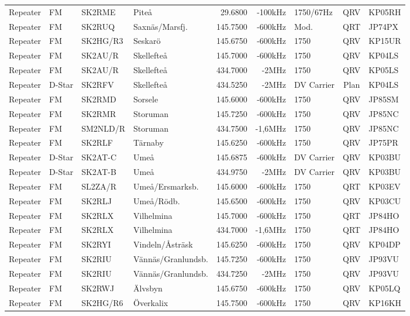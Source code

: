 \begin{landscape}
\begin{longtable}{llllrrlcl}
Repeater & FM     & SK2RME    & Piteå              & 29.6800  & -100kHz & 1750/67Hz        & QRV  & KP05RH \\
Repeater & FM     & SK2RUQ    & Saxnäs/Marsfj.     & 145.7500 & -600kHz & Mod.             & QRT  & JP74PX \\
Repeater & FM     & SK2HG/R3  & Seskarö            & 145.6750 & -600kHz & 1750             & QRV  & KP15UR \\
Repeater & FM     & SK2AU/R   & Skellefteå         & 145.7000 & -600kHz & 1750             & QRV  & KP04LS \\
Repeater & FM     & SK2AU/R   & Skellefteå         & 434.7000 & -2MHz   & 1750             & QRV  & KP05LS \\
Repeater & D-Star & SK2RFV    & Skellefteå         & 434.5250 & -2MHz   & DV Carrier       & Plan & KP04LS \\
Repeater & FM     & SK2RMD    & Sorsele            & 145.6000 & -600kHz & 1750             & QRV  & JP85SM \\
Repeater & FM     & SK2RMR    & Storuman           & 145.7250 & -600kHz & 1750             & QRV  & JP85NC \\
Repeater & FM     & SM2NLD/R  & Storuman           & 434.7500 & -1,6MHz & 1750             & QRV  & JP85NC \\
Repeater & FM     & SK2RLF    & Tärnaby            & 145.6250 & -600kHz & 1750             & QRV  & JP75PR \\
Repeater & D-Star & SK2AT-C   & Umeå               & 145.6875 & -600kHz & DV Carrier       & QRV  & KP03BU \\
Repeater & D-Star & SK2AT-B   & Umeå               & 434.9750 & -2MHz   & DV Carrier       & QRV  & KP03BU \\
Repeater & FM     & SL2ZA/R   & Umeå/Ersmarksb.    & 145.6000 & -600kHz & 1750             & QRT  & KP03EV \\
Repeater & FM     & SK2RLJ    & Umeå/Rödb.         & 145.6500 & -600kHz & 1750             & QRV  & KP03CU \\
Repeater & FM     & SK2RLX    & Vilhelmina         & 145.7000 & -600kHz & 1750             & QRT  & JP84HO \\
Repeater & FM     & SK2RLX    & Vilhelmina         & 434.7000 & -1,6MHz & 1750             & QRT  & JP84HO \\
Repeater & FM     & SK2RYI    & Vindeln/Åsträsk    & 145.6250 & -600kHz & 1750             & QRV  & KP04DP \\
Repeater & FM     & SK2RIU    & Vännäs/Granlundsb. & 145.7250 & -600kHz & 1750             & QRV  & JP93VU \\
Repeater & FM     & SK2RIU    & Vännäs/Granlundsb. & 434.7250 & -2MHz   & 1750             & QRV  & JP93VU \\
Repeater & FM     & SK2RWJ    & Älvsbyn            & 145.6750 & -600kHz & 1750             & QRV  & KP05LQ \\
Repeater & FM     & SK2HG/R6  & Överkalix          & 145.7500 & -600kHz & 1750             & QRV  & KP16KH


\end{longtable}
\end{landscape}
